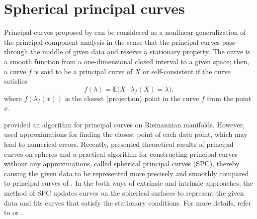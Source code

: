 \section{Spherical principal curves}
Principal curves proposed by \citet{Hastie1989} can be considered as a nonlinear generalization of the principal component analysis in the sense that the principal curves pass through the middle of given data and reserve a stationary property. The curve is a smooth function from a one-dimensional closed interval to a given space; then, a curve $f$ is said to be a principal curve of $X$ or self-consistent if the curve satisfies 
\begin{equation*}
f(\lambda) = \mathbb{E}\big(X \ | \ \lambda_{f}(X)=\lambda\big),
\end{equation*}
where $f(\lambda_f(x))$ is the closest (projection) point in the curve $f$ from the point $x$.

\citet{Hauberg2016} provided an algorithm for principal curves on Riemannian manifolds. However, \citet{Hauberg2016} used approximations for finding the closest point of each data point, which may lead to numerical errors. Recently, \citet{Lee2021} presented theoretical results of principal curves on spheres and a practical algorithm for constructing principal curves without any approximations, called spherical principal curves (SPC), thereby causing the given data to be represented more precisely and smoothly compared to principal curves of \citet{Hauberg2016}. In the both ways of extrinsic and intrinsic approaches, the method of SPC updates curves on the spherical surfaces to represent the given data and fits curves that satisfy the stationary conditions. For more details, refer to \citet{Kim2020} or \citet{Lee2021}.

